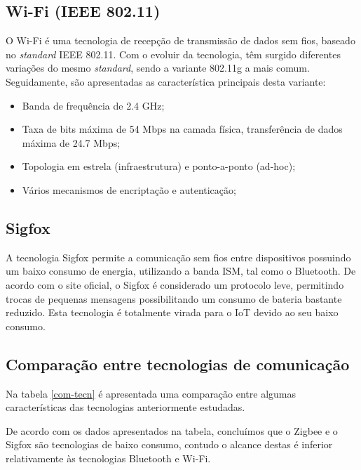 \subsection{Wi-Fi (IEEE 802.11)}


O Wi-Fi é uma tecnologia de recepção de transmissão de dados sem fios, baseado no \textit{standard} IEEE 802.11. Com o evoluir da tecnologia, têm surgido diferentes variações do mesmo \textit{standard}, sendo a variante 802.11g a mais comum. Seguidamente, são apresentadas as característica principais desta variante\cite{Paper2005}\cite{urlwifi}:


\begin{itemize}
	\item Banda de frequência de 2.4 GHz;
	\item Taxa de bits máxima de 54 Mbps na camada física, transferência de dados máxima de 24.7 Mbps;
	\item Topologia em estrela (infraestrutura) e ponto-a-ponto (ad-hoc);
	\item Vários mecanismos de encriptação e autenticação;
\end{itemize}







\subsection{Sigfox}


A tecnologia Sigfox permite a comunicação sem fios entre dispositivos possuindo um baixo consumo de energia, utilizando a banda \ac{ISM}, tal como o Bluetooth. De acordo com o site oficial, o Sigfox é considerado um protocolo leve, permitindo trocas de pequenas mensagens possibilitando um consumo de bateria bastante reduzido\cite{sigfoxsite}. Esta tecnologia é totalmente virada para o \ac{IoT} devido ao seu baixo consumo. 




\subsection{Comparação entre tecnologias de comunicação}

Na tabela \ref{com-tecn} é apresentada uma comparação entre algumas características das tecnologias anteriormente estudadas. 

De acordo com os dados apresentados na tabela, concluímos que o Zigbee e o Sigfox são tecnologias de baixo consumo, contudo o alcance destas é inferior relativamente às tecnologias Bluetooth e Wi-Fi. 




